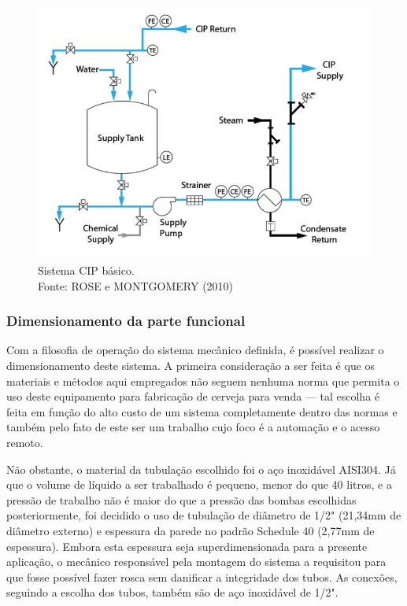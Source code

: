 \begin{figure}[H]
	\centering
	\includegraphics[scale=0.55]{./Resources/cip_example.jpg}
	\captionsetup{justification=centering}
	\caption[Sistema CIP básico]{Sistema CIP básico. \\Fonte: ROSE e MONTGOMERY (2010)}
	\label{cip_system}
\end{figure}

\subsubsection{Dimensionamento da parte funcional} 

Com a filosofia de operação do sistema mecânico definida, é possível realizar o dimensionamento deste sistema. A primeira consideração a ser feita é que os materiais e métodos aqui empregados não seguem nenhuma norma que permita o uso deste equipamento para fabricação de cerveja para venda --- tal escolha é feita em função do alto custo de um sistema completamente dentro das normas e também pelo fato de este ser um trabalho cujo foco é a automação e o acesso remoto.

Não obstante, o material da tubulação escolhido foi o aço inoxidável AISI304. Já que o volume de líquido a ser trabalhado é pequeno, menor do que 40 litros, e a pressão de trabalho não é maior do que a pressão das bombas escolhidas posteriormente, foi decidido o uso de tubulação de diâmetro de 1/2" (21,34mm de diâmetro externo) e espessura da parede no padrão Schedule 40 (2,77mm de espessura). Embora esta espessura seja superdimensionada para a presente aplicação, o mecânico responsável pela montagem do sistema a requisitou para que fosse possível fazer rosca sem danificar a integridade dos tubos. As conexões, seguindo a escolha dos tubos, também são de aço inoxidável de 1/2".

